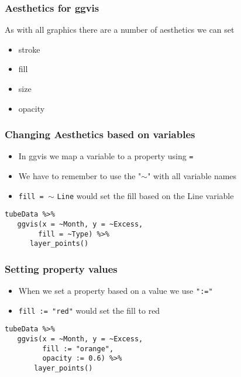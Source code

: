 \documentclass[MASTER.tex]{subfiles}
\begin{document}
 
\begin{frame}
\frametitle{Aesthetics for ggvis}
\Large
As with all graphics there are a number of
aesthetics we can set
\begin{itemize}
\item stroke
\item fill
\item size
\item opacity
\end{itemize}
\end{frame}

\begin{frame}
\frametitle{Changing Aesthetics based on variables}
\Large
\begin{itemize}
\item In ggvis we map a variable to a property using \texttt{=}
\item We have to remember to use the "$\sim$" with all
variable names
\item \texttt{fill = }$\sim$ \texttt{Line} would set the fill based on the Line
variable
\end{itemize}
\end{frame}
\begin{frame}[fragile]
\Large
\begin{framed}
	\begin{verbatim}
tubeData %>%
   ggvis(x = ~Month, y = ~Excess, 
        fill = ~Type) %>%
      layer_points()
\end{verbatim}
\end{framed}

\end{frame}
\begin{frame}[fragile]
\frametitle{Setting property values}
\vspace{-1.9cm}
\Large
\begin{itemize}
\item When we set a property based on a value we use
\texttt{":="}
\item \texttt{fill := "red"} would set the fill to red
\end{itemize}
\end{frame}
\begin{frame}[fragile]
	\Large
\begin{framed}
\begin{verbatim}
tubeData %>%
   ggvis(x = ~Month, y = ~Excess, 
         fill := "orange",
         opacity := 0.6) %>%
       layer_points()

\end{verbatim}
\end{framed}


\end{frame}
\end{document}

